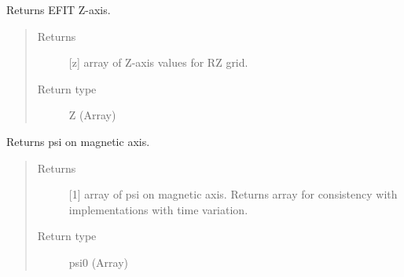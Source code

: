 \documentclass[letterpaper,10pt,english]{sphinxmanual}
\begin{document}
\begin{fulllineitems}
\begin{fulllineitems}
\end{fulllineitems}


\begin{fulllineitems}
\label{\detokenize{eqtools:eqtools.eqdskreader.EqdskReader.getZGrid}}
Returns EFIT Z-axis.
\begin{quote}\begin{description}
\item[{Returns}] \leavevmode
{[}z{]} array of Z-axis values for RZ grid.

\item[{Return type}] \leavevmode
Z (Array)

\end{description}\end{quote}

\end{fulllineitems}


\begin{fulllineitems}
\label{\detokenize{eqtools:eqtools.eqdskreader.EqdskReader.getFluxAxis}}
Returns psi on magnetic axis.
\begin{quote}\begin{description}
\item[{Returns}] \leavevmode
{[}1{]} array of psi on magnetic axis.  Returns array for
consistency with {\hyperref[\detokenize{eqtools:eqtools.core.Equilibrium}]{}}
implementations with time variation.

\item[{Return type}] \leavevmode
psi0 (Array)

\end{description}\end{quote}

\end{fulllineitems}



\end{fulllineitems}
\end{document}

